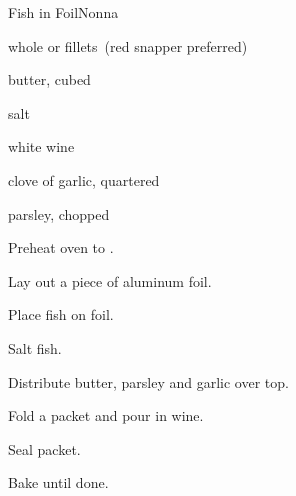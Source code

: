 \begin{recipe}{Fish in Foil}{Nonna}{}

\begin{ingredients}
\item whole  or fillets~(red snapper preferred)
\item butter, cubed
\item salt
\item white wine
\item clove of garlic, quartered
\item parsley, chopped
\end{ingredients}

\begin{directions}
\item Preheat oven to .
\item Lay out a piece of aluminum foil.
\item Place fish on foil.
\item Salt fish.
\item Distribute butter, parsley and garlic over top.
\item Fold a packet and pour in wine.
\item Seal packet.
\item Bake until done.
\end{directions}

\end{recipe}
